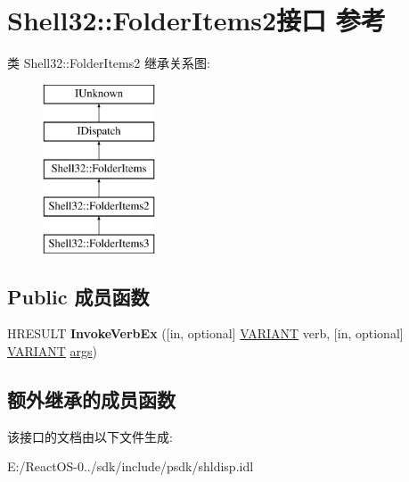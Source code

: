 \hypertarget{interface_shell32_1_1_folder_items2}{}\section{Shell32\+:\+:Folder\+Items2接口 参考}
\label{interface_shell32_1_1_folder_items2}
类 Shell32\+:\+:Folder\+Items2 继承关系图\+:\begin{figure}[H]
\begin{center}
\leavevmode
\includegraphics[height=5.000000cm]{interface_shell32_1_1_folder_items2}
\end{center}
\end{figure}
\subsection*{Public 成员函数}
\begin{DoxyCompactItemize}
\item 
\mbox{\label{interface_shell32_1_1_folder_items2_a97599d0fc725b5d69c6e0406e9ba9f00}} 
H\+R\+E\+S\+U\+LT {\bfseries Invoke\+Verb\+Ex} (\mbox{[}in, optional\mbox{]} \hyperlink{structtag_v_a_r_i_a_n_t}{V\+A\+R\+I\+A\+NT} verb, \mbox{[}in, optional\mbox{]} \hyperlink{structtag_v_a_r_i_a_n_t}{V\+A\+R\+I\+A\+NT} \hyperlink{structargs}{args})
\end{DoxyCompactItemize}
\subsection*{额外继承的成员函数}


该接口的文档由以下文件生成\+:\begin{DoxyCompactItemize}
\item 
E\+:/\+React\+O\+S-\/0../sdk/include/psdk/shldisp.\+idl\end{DoxyCompactItemize}
